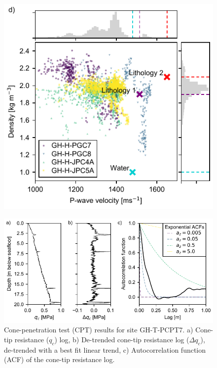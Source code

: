 \documentclass[se,manuscript]{copernicus}
\begin{document}
\setcounter{figure}{0}

\begin{figure}
    \includegraphics{figures/si_fig01_pg_2.pdf}
    \caption{}
\end{figure}

\clearpage

\begin{figure}
    \includegraphics{figures/si_fig02.pdf}
    \caption{Cone-penetration test (CPT) results for site GH-T-PCPT7. a) Cone-tip resistance ($q_c$) log, b) De-trended cone-tip resistance log ($\Delta q_c$), de-trended with a best fit linear trend, c) Autocorrelation function (ACF) of the cone-tip resistance log.}
    \label{fig:cpt}
\end{figure}
\end{document}
